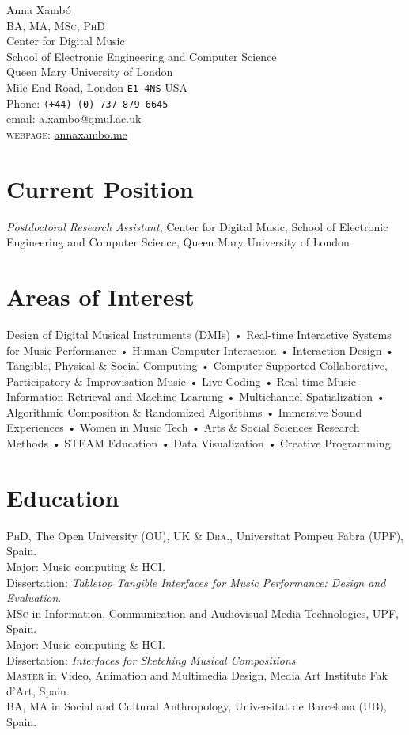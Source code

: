 \documentclass[10pt, a4paper]{article}
\newcommand{\years}[1]{\marginnote{\scriptsize #1}}
\begin{document}
{\Huge Anna Xambó}\\[0.1cm]
\textsc{BA, MA, MSc, PhD}\\[1cm]
Center for Digital Music\\
School of Electronic Engineering and Computer Science\\
Queen Mary University of London\\
Mile End Road, London \texttt{E1 4NS}
USA\\[.2cm]
Phone: \texttt{(+44) (0) 737-879-6645}\\
email: \href{mailto:a.xambo@qmul.ac.uk}{a.xambo@qmul.ac.uk}\\
\textsc{webpage}: \href{http://annaxambo.me/}{annaxambo.me}\\ 

\section*{Current Position}
\emph{Postdoctoral Research Assistant}, Center for Digital Music, School of Electronic Engineering and Computer Science, Queen Mary University of London

\section*{Areas of Interest}
Design of Digital Musical Instruments (DMIs) • Real-time Interactive Systems for Music Performance • Human-Computer Interaction • Interaction Design • Tangible, Physical \& Social Computing • Computer-Supported Collaborative, Participatory \& Improvisation Music • Live Coding • Real-time Music Information Retrieval and Machine Learning • Multichannel Spatialization • Algorithmic Composition \& Randomized Algorithms • Immersive Sound Experiences • Women in Music Tech • Arts \& Social Sciences Research Methods • STEAM Education • Data Visualization • Creative Programming

\section*{Education}
\noindent
\years{2015}\textsc{PhD}, The Open University (OU), UK \& \textsc{Dra.}, Universitat Pompeu Fabra (UPF), Spain.\\
Major: Music computing \& HCI.\\ 
Dissertation: \emph{Tabletop Tangible Interfaces for Music Performance: Design and Evaluation}.\\
\years{2008}\textsc{MSc} in Information, Communication and Audiovisual Media Technologies, UPF, Spain.\\
Major: Music computing \& HCI.\\ 
Dissertation: \emph{Interfaces for Sketching Musical Compositions}.\\
\years{1999}\textsc{Master} in Video, Animation and Multimedia Design, Media Art Institute Fak d'Art, Spain.\\
\years{1996}\textsc{BA, MA} in Social and Cultural Anthropology, Universitat de Barcelona (UB), Spain.
\end{document}
